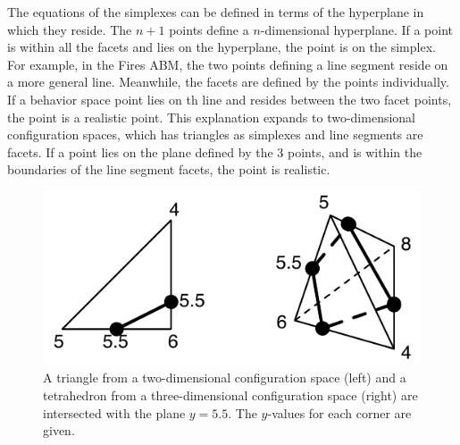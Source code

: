 The equations of the simplexes can be defined in terms of the hyperplane in which they reside.
The $n+1$ points define a $n$-dimensional hyperplane.
If a point is within all the facets and lies on the hyperplane, the point is on the simplex.
For example, in the Fires ABM, the two points defining a line segment reside on a more general line.
Meanwhile, the facets are defined by the points individually.
If a behavior space point lies on th line and resides between the two facet points, the point is a realistic point.
This explanation expands to two-dimensional configuration spaces, which has triangles as simplexes and line segments are facets.
If a point lies on the plane defined by the 3 points, and is within the boundaries of the line segment facets, the point is realistic.


\begin{figure}[ht]
\centering
\includegraphics[scale=1]{images/simint.pdf}
\caption{A triangle from a two-dimensional configuration space (left) and a tetrahedron from a three-dimensional configuration space (right) are intersected with the plane $y=5.5$. The $y$-values for each corner are given.}
\label{fig:simint}
\end{figure}

